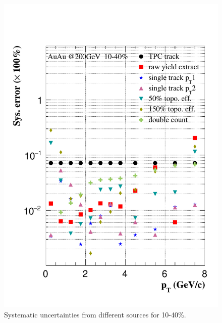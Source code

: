 \begin{figure}[htbp]
\begin{minipage}[htbp]{0.47\linewidth}
\includegraphics[width=1.0\textwidth,angle=0]{figure/Run14_D0HFT/sysErr_10_40.pdf} 
\caption{ Systematic uncertainties from different sources for 10-40\%. \label{sysErr_10_40}}
\end{minipage}
\end{figure}

